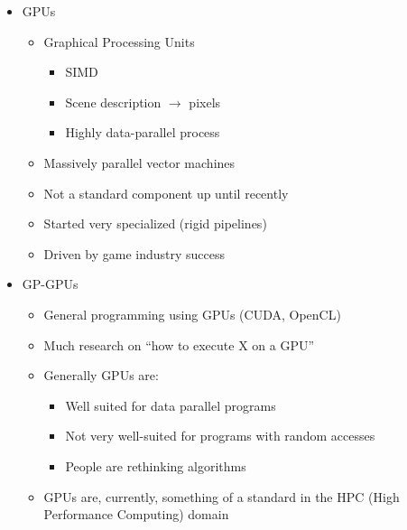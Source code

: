 \documentclass[a4paper]{article}
\begin{document}
\begin{itemize}
\item GPUs
\begin{itemize}
\item Graphical Processing Units 
\begin{itemize}
\item SIMD
\item Scene description $\to$ pixels
\item Highly data-parallel process
\end{itemize}
\item Massively parallel vector machines
\item Not a standard component up until recently
\item Started very specialized (rigid pipelines)
\item Driven by game industry success
\end{itemize}
\item GP-GPUs
\begin{itemize}
\item General programming using GPUs (CUDA, OpenCL)
\item Much research on ``how to execute X on a GPU''
\item Generally GPUs are:
\begin{itemize}
\item Well suited for data parallel programs
\item Not very well-suited for programs with random accesses
\item People are rethinking algorithms
\end{itemize}
\item GPUs are, currently, something of a standard in the HPC (High Performance Computing) domain
\end{itemize}
\end{itemize}
\end{document}
